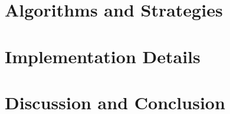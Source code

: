 \documentclass{../tech_reports/template/llncs}
\begin{document}
\section{Algorithms and Strategies}


\section{Implementation Details}


\section{Discussion and Conclusion}


%
%
\printbibliography
\end{document}

